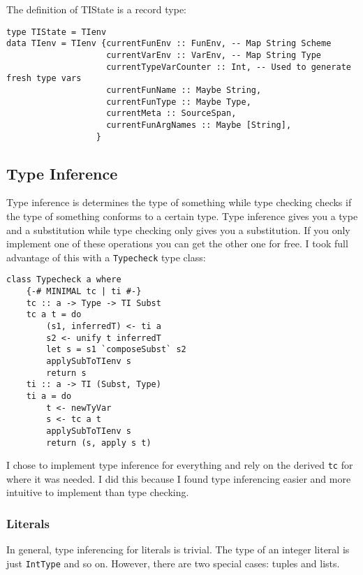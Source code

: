 \documentclass{report}
\begin{document}
\noindent The definition of TIState is a record type: 

\begin{verbatim}
type TIState = TIenv
data TIenv = TIenv {currentFunEnv :: FunEnv, -- Map String Scheme
                    currentVarEnv :: VarEnv, -- Map String Type
                    currentTypeVarCounter :: Int, -- Used to generate fresh type vars
                    currentFunName :: Maybe String, 
                    currentFunType :: Maybe Type,
                    currentMeta :: SourceSpan, 
                    currentFunArgNames :: Maybe [String],
                  }
\end{verbatim}




\subsection{Type Inference}

Type inference is determines the type of something while type checking checks if the type of something conforms to a certain type. Type inference gives you a type and a substitution while type checking only gives you a substitution. If you only implement one of these operations you can get the other one for free. I took full advantage of this with a \texttt{Typecheck} type class:

\begin{verbatim}
class Typecheck a where
    {-# MINIMAL tc | ti #-}
    tc :: a -> Type -> TI Subst
    tc a t = do
        (s1, inferredT) <- ti a
        s2 <- unify t inferredT
        let s = s1 `composeSubst` s2
        applySubToTIenv s
        return s
    ti :: a -> TI (Subst, Type)
    ti a = do
        t <- newTyVar
        s <- tc a t
        applySubToTIenv s
        return (s, apply s t)
\end{verbatim}

I chose to implement type inference for everything and rely on the derived \texttt{tc} for where it was needed. I did this because I found type inferencing easier and more intuitive to implement than type checking. 

\subsubsection{Literals} 

In general, type inferencing for literals is trivial. The type of an integer literal is just \texttt{IntType} and so on. However, there are two special cases: tuples and lists.
\end{document}
